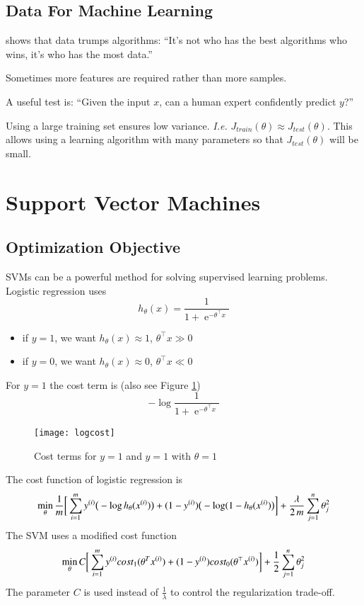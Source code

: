 \documentclass[a4paper,twoside,10pt]{article}
\begin{document}
\subsection{Data For Machine Learning}
\citep{banko2001scaling} shows that data trumps algorithms:
``It’s not who has the best algorithms who wins, it’s who has the most data.''

Sometimes more features are required rather than more samples.

A useful test is: ``Given the input $x$, can a human expert confidently predict $y$?''

Using a large training set ensures low variance. \emph{I.e.} $J_{train}(\theta)\approx J_{test}(\theta)$.
This allows using a learning algorithm with many parameters so that $J_{test}(\theta)$ will be small.

\section{Support Vector Machines}
\subsection{Optimization Objective}
\acp{SVM} can be a powerful method for solving supervised learning problems.
Logistic regression uses
\begin{equation*}
  h_\theta(x)=\frac{1}{1+\operatorname{e}^{-\theta^\top x}}
\end{equation*}
\begin{itemize}
  \item if $y=1$, we want $h_\theta(x)\approx 1$, $\theta^\top x\gg0$
  \item if $y=0$, we want $h_\theta(x)\approx 0$, $\theta^\top x\ll0$
\end{itemize}
For $y=1$ the cost term is (also see Figure \ref{fig:logcost})
\begin{equation*}
  -\operatorname{log}\frac{1}{1+\operatorname{e}^{-\theta^\top x}}
\end{equation*}
\begin{figure}[htbp]
  \begin{center}
    \texttt{[image: logcost]}
    \caption{Cost terms for $y=1$ and $y=1$ with $\theta=1$\label{fig:logcost}}
  \end{center}
\end{figure}

The cost function of logistic regression is
\begin{equation*}
  \mathop{\operatorname{min}}_\theta\frac{1}{m}\bigg[\displaystyle\sum_{i=1}^my^{(i)}\big(-\operatorname{log}h_\theta(x^{(i)})\big)+(1-y^{(i)})\big(-\operatorname{log}(1-h_\theta(x^{(i)})\big)\bigg]+\frac{\lambda}{2\,m}\sum_{j=1}^n\theta_j^2
\end{equation*}
The \ac{SVM} uses a modified cost function
\begin{equation*}
  \mathop{\operatorname{min}}_\theta C\bigg[\displaystyle\sum_{i=1}^my^{(i)} cost_1(\theta^Tx^{(i)})+(1-y^{(i)})cost_0(\theta^\top x^{(i)})\bigg]+\frac{1}{2}\sum_{j=1}^n\theta_j^2
\end{equation*}
The parameter $C$ is used instead of $\frac{1}{\lambda}$ to control the regularization trade-off.
\end{document}
